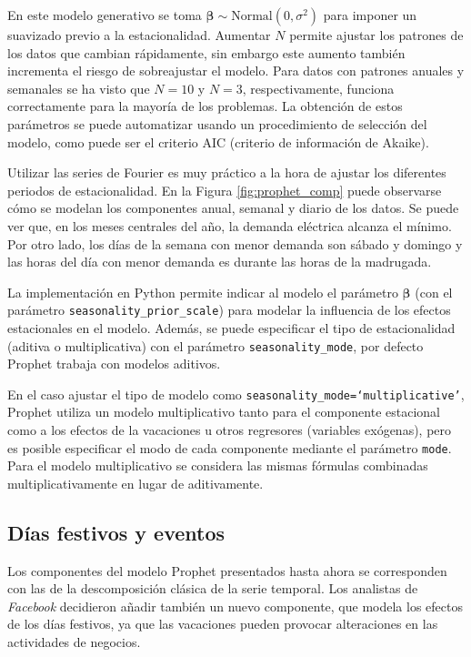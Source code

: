 \documentclass[12pt,twoside]{article}
\begin{document}
En este modelo generativo se toma $\boldsymbol{\beta} \sim \text{Normal}(0, \sigma^2)$ para imponer un suavizado previo a la estacionalidad. Aumentar $N$ permite ajustar los patrones de los datos que cambian rápidamente, sin embargo este aumento también incrementa el riesgo de sobreajustar el modelo. Para datos con patrones anuales y semanales se ha visto que $N=10$ y $N=3$, respectivamente, funciona correctamente para la mayoría de los problemas. La obtención de estos parámetros se puede automatizar usando un procedimiento de selección del modelo, como puede ser el criterio AIC (criterio de información de Akaike).

Utilizar las series de Fourier es muy práctico a la hora de ajustar los diferentes periodos de estacionalidad. En la Figura \ref{fig:prophet_comp} puede observarse cómo se modelan los componentes anual, semanal y diario de los datos. Se puede ver que, en los meses centrales del año, la demanda eléctrica alcanza el mínimo. Por otro lado, los días de la semana con menor demanda son sábado y domingo y las horas del día con menor demanda es durante las horas de la madrugada.

La implementación en Python permite indicar al modelo el parámetro $\boldsymbol{\beta}$ (con el parámetro \texttt{seasonality\_prior\_scale}) para modelar la influencia de los efectos estacionales en el modelo. Además, se puede especificar el tipo de estacionalidad (aditiva o multiplicativa) con el parámetro \texttt{seasonality\_mode}, por defecto Prophet trabaja con modelos aditivos. 

En el caso ajustar el tipo de modelo como \texttt{seasonality\_mode=`multiplicative'}, Prophet utiliza un modelo multiplicativo tanto para el componente estacional como a los efectos de la vacaciones u otros regresores (variables exógenas), pero es posible especificar el modo de cada componente mediante el parámetro \texttt{mode}. Para el modelo multiplicativo se considera las mismas fórmulas combinadas multiplicativamente en lugar de aditivamente.



\subsection{Días festivos y eventos}
Los componentes del modelo Prophet presentados hasta ahora se corresponden con las de la descomposición clásica de la serie temporal. Los analistas de \emph{Facebook} decidieron añadir también un nuevo componente, que modela los efectos de los días festivos, ya que las vacaciones pueden provocar alteraciones en las actividades de negocios. 
\end{document}

